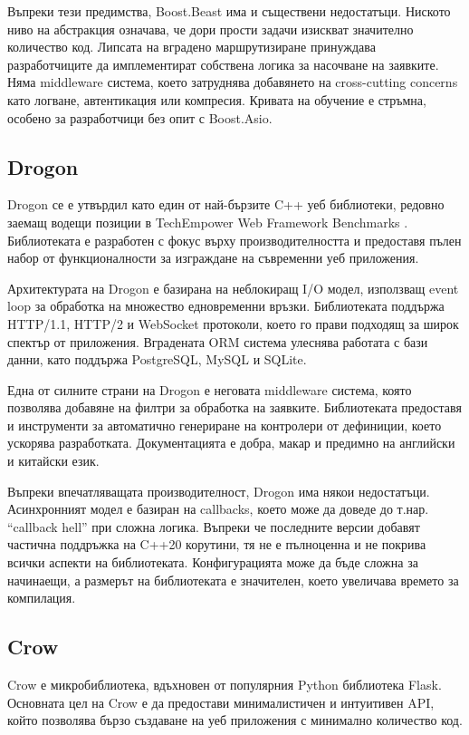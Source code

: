 Въпреки тези предимства, Boost.Beast има и съществени недостатъци. Ниското ниво на абстракция означава, че дори прости задачи изискват значително количество код. Липсата на вградено маршрутизиране принуждава разработчиците да имплементират собствена логика за насочване на заявките. Няма middleware система, което затруднява добавянето на cross-cutting concerns като логване, автентикация или компресия. Кривата на обучение е стръмна, особено за разработчици без опит с Boost.Asio.

\subsection{Drogon}

Drogon \cite{drogon} се е утвърдил като един от най-бързите C++ уеб библиотеки, редовно заемащ водещи позиции в TechEmpower Web Framework Benchmarks \cite{techempower}. Библиотеката е разработен с фокус върху производителността и предоставя пълен набор от функционалности за изграждане на съвременни уеб приложения.

Архитектурата на Drogon е базирана на неблокиращ I/O модел, използващ event loop за обработка на множество едновременни връзки. Библиотеката поддържа HTTP/1.1, HTTP/2 и WebSocket протоколи, което го прави подходящ за широк спектър от приложения. Вградената ORM система улеснява работата с бази данни, като поддържа PostgreSQL, MySQL и SQLite.

Една от силните страни на Drogon е неговата middleware система, която позволява добавяне на филтри за обработка на заявките. Библиотеката предоставя и инструменти за автоматично генериране на контролери от дефиниции, което ускорява разработката. Документацията е добра, макар и предимно на английски и китайски език.

Въпреки впечатляващата производителност, Drogon има някои недостатъци. Асинхронният модел е базиран на callbacks, което може да доведе до т.нар. ``callback hell'' при сложна логика. Въпреки че последните версии добавят частична поддръжка на C++20 корутини, тя не е пълноценна и не покрива всички аспекти на библиотеката. Конфигурацията може да бъде сложна за начинаещи, а размерът на библиотеката е значителен, което увеличава времето за компилация.

\subsection{Crow}

Crow \cite{crow} е микробиблиотека, вдъхновен от популярния Python библиотека Flask. Основната цел на Crow е да предостави минималистичен и интуитивен API, който позволява бързо създаване на уеб приложения с минимално количество код.

